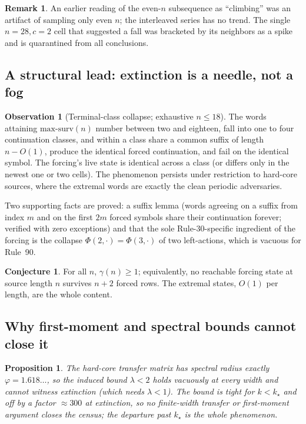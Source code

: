 \documentclass[11pt]{article}
\newtheorem{proposition}[theorem]{Proposition}
\theoremstyle{definition}
\newtheorem{conjecture}[theorem]{Conjecture}
\newtheorem{observation}[theorem]{Observation}
\newtheorem{remark}[theorem]{Remark}
\newcommand{\gm}{\gamma}
\begin{document}
\begin{remark}
An earlier reading of the even-$n$ subsequence as ``climbing'' was an artifact
of sampling only even $n$; the interleaved series has no trend. The single
$n=28,c=2$ cell that suggested a fall was bracketed by its neighbors as a spike
and is quarantined from all conclusions.
\end{remark}

\subsection{A structural lead: extinction is a needle, not a fog}

\begin{observation}[Terminal-class collapse; exhaustive $n\le18$]\label{obs:needle}
The words attaining $\mathrm{max\text{-}surv}(n)$ number between two and
eighteen, fall into one to four continuation classes, and within a class share a
common suffix of length $n-O(1)$, produce the identical forced continuation, and
fail on the identical symbol. The forcing's live state is identical across a
class (or differs only in the newest one or two cells). The phenomenon persists
under restriction to hard-core sources, where the extremal words are exactly the
clean periodic adversaries.
\end{observation}

Two supporting facts are proved: a suffix lemma (words agreeing on a suffix from
index $m$ and on the first $2m$ forced symbols share their continuation forever;
verified with zero exceptions) and that the sole Rule-30-specific ingredient of
the forcing is the collapse $\Phi(2,\cdot)=\Phi(3,\cdot)$ of two left-actions,
which is vacuous for Rule~90.

\begin{conjecture}\label{conj:needle}
For all $n$, $\gm(n)\ge1$; equivalently, no reachable forcing state at source
length $n$ survives $n+2$ forced rows. The extremal states, $O(1)$ per length,
are the whole content.
\end{conjecture}

\subsection{Why first-moment and spectral bounds cannot close it}

\begin{proposition}\label{prop:spectral}
The hard-core transfer matrix has spectral radius exactly $\varphi=1.618\ldots$,
so the induced bound $\lambda<2$ holds vacuously at every width and cannot
witness extinction (which needs $\lambda<1$). The bound is tight for $k<k_\star$
and off by a factor $\approx300$ at extinction, so no finite-width transfer or
first-moment argument closes the census; the departure past $k_\star$ is the
whole phenomenon.
\end{proposition}
\end{document}
